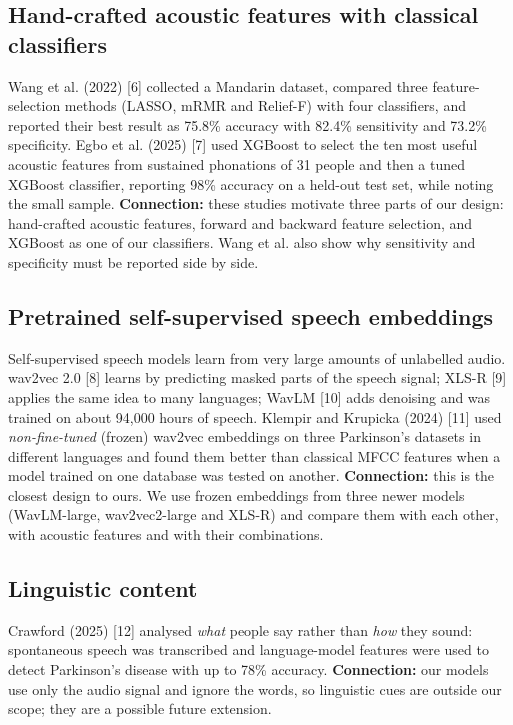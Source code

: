 \documentclass[11pt,a4paper]{article}
\begin{document}
\subsection{Hand-crafted acoustic features with classical classifiers}
Wang et al. (2022) [6] collected a Mandarin dataset, compared three feature-selection methods (LASSO, mRMR and Relief-F) with four classifiers, and reported their best result as 75.8\% accuracy with 82.4\% sensitivity and 73.2\% specificity. Egbo et al. (2025) [7] used XGBoost to select the ten most useful acoustic features from sustained phonations of 31 people and then a tuned XGBoost classifier, reporting 98\% accuracy on a held-out test set, while noting the small sample. \textbf{Connection:} these studies motivate three parts of our design: hand-crafted acoustic features, forward and backward feature selection, and XGBoost as one of our classifiers. Wang et al. also show why sensitivity and specificity must be reported side by side.

\subsection{Pretrained self-supervised speech embeddings}
Self-supervised speech models learn from very large amounts of unlabelled audio. wav2vec 2.0 [8] learns by predicting masked parts of the speech signal; XLS-R [9] applies the same idea to many languages; WavLM [10] adds denoising and was trained on about 94,000 hours of speech. Klempir and Krupicka (2024) [11] used \emph{non-fine-tuned} (frozen) wav2vec embeddings on three Parkinson's datasets in different languages and found them better than classical MFCC features when a model trained on one database was tested on another. \textbf{Connection:} this is the closest design to ours. We use frozen embeddings from three newer models (WavLM-large, wav2vec2-large and XLS-R) and compare them with each other, with acoustic features and with their combinations.

\subsection{Linguistic content}
Crawford (2025) [12] analysed \emph{what} people say rather than \emph{how} they sound: spontaneous speech was transcribed and language-model features were used to detect Parkinson's disease with up to 78\% accuracy. \textbf{Connection:} our models use only the audio signal and ignore the words, so linguistic cues are outside our scope; they are a possible future extension.
\end{document}
